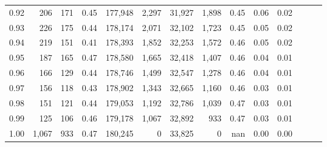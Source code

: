 \begin{tabular}{rrrrrrrrrrrrrr}
0.92 &    206 &  171 &  0.45 &  177,948 &    2,297 &  31,927 &   1,898 &  0.45 &  0.06 &      0.02 \\
0.93 &    226 &  175 &  0.44 &  178,174 &    2,071 &  32,102 &   1,723 &  0.45 &  0.05 &      0.02 \\
0.94 &    219 &  151 &  0.41 &  178,393 &    1,852 &  32,253 &   1,572 &  0.46 &  0.05 &      0.02 \\
0.95 &    187 &  165 &  0.47 &  178,580 &    1,665 &  32,418 &   1,407 &  0.46 &  0.04 &      0.01 \\
0.96 &    166 &  129 &  0.44 &  178,746 &    1,499 &  32,547 &   1,278 &  0.46 &  0.04 &      0.01 \\
0.97 &    156 &  118 &  0.43 &  178,902 &    1,343 &  32,665 &   1,160 &  0.46 &  0.03 &      0.01 \\
0.98 &    151 &  121 &  0.44 &  179,053 &    1,192 &  32,786 &   1,039 &  0.47 &  0.03 &      0.01 \\
0.99 &    125 &  106 &  0.46 &  179,178 &    1,067 &  32,892 &     933 &  0.47 &  0.03 &      0.01 \\
1.00 &  1,067 &  933 &  0.47 &  180,245 &        0 &  33,825 &       0 &   nan &  0.00 &      0.00 \\
\bottomrule
\end{tabular}
